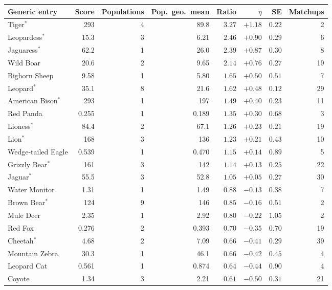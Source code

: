 \documentclass[11pt]{article}
\begin{document}
\begin{table}[H]
\centering
\footnotesize
\setlength{\tabcolsep}{4pt}
\begin{tabular}{lrrrrrrr}
\toprule
Generic entry & Score & Populations & Pop.\ geo.\ mean & Ratio & $\eta$ & SE & Matchups \\
\midrule
Tiger$^{\ast}$ & 293 & 4 & 89.8 & $3.27$ & $+1.18$ & $0.22$ & 2 \\
Leopardess$^{\ast}$ & 15.3 & 3 & 6.21 & $2.46$ & $+0.90$ & $0.29$ & 6 \\
Jaguaress$^{\ast}$ & 62.2 & 1 & 26.0 & $2.39$ & $+0.87$ & $0.30$ & 8 \\
Wild Boar & 20.6 & 2 & 9.65 & $2.14$ & $+0.76$ & $0.27$ & 19 \\
Bighorn Sheep & 9.58 & 1 & 5.80 & $1.65$ & $+0.50$ & $0.51$ & 7 \\
Leopard$^{\ast}$ & 35.1 & 8 & 21.6 & $1.62$ & $+0.48$ & $0.12$ & 29 \\
American Bison$^{\ast}$ & 293 & 1 & 197 & $1.49$ & $+0.40$ & $0.23$ & 11 \\
Red Panda & 0.255 & 1 & 0.189 & $1.35$ & $+0.30$ & $0.68$ & 3 \\
Lioness$^{\ast}$ & 84.4 & 2 & 67.1 & $1.26$ & $+0.23$ & $0.21$ & 19 \\
Lion$^{\ast}$ & 168 & 3 & 136 & $1.23$ & $+0.21$ & $0.43$ & 10 \\
Wedge-tailed Eagle & 0.539 & 1 & 0.470 & $1.15$ & $+0.14$ & $0.89$ & 5 \\
Grizzly Bear$^{\ast}$ & 161 & 3 & 142 & $1.14$ & $+0.13$ & $0.25$ & 22 \\
Jaguar$^{\ast}$ & 55.5 & 3 & 52.8 & $1.05$ & $+0.05$ & $0.27$ & 30 \\
Water Monitor & 1.31 & 1 & 1.49 & $0.88$ & $-0.13$ & $0.38$ & 7 \\
Brown Bear$^{\ast}$ & 124 & 9 & 146 & $0.85$ & $-0.16$ & $0.51$ & 2 \\
Mule Deer & 2.35 & 1 & 2.92 & $0.80$ & $-0.22$ & $1.05$ & 2 \\
Red Fox & 0.276 & 2 & 0.393 & $0.70$ & $-0.35$ & $0.70$ & 19 \\
Cheetah$^{\ast}$ & 4.68 & 2 & 7.09 & $0.66$ & $-0.41$ & $0.29$ & 39 \\
Mountain Zebra & 30.3 & 1 & 46.1 & $0.66$ & $-0.42$ & $0.45$ & 4 \\
Leopard Cat & 0.561 & 1 & 0.874 & $0.64$ & $-0.44$ & $0.90$ & 4 \\
Coyote & 1.34 & 3 & 2.21 & $0.61$ & $-0.50$ & $0.31$ & 21 \\

\end{tabular}
\end{table}
\end{document}
